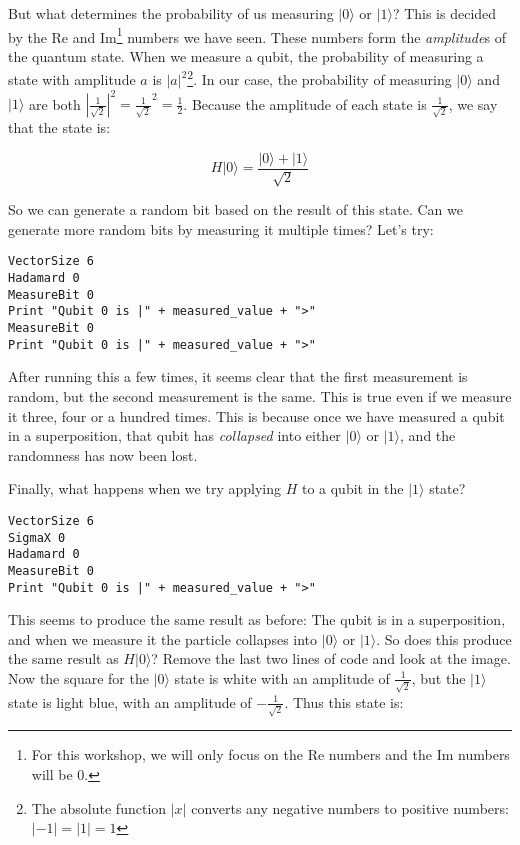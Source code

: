 \documentclass[twocolumn]{article}
\begin{document}
But what determines the probability of us measuring $|0\rangle$ or $|1\rangle$? This is decided by the Re and Im\footnote{For this workshop, we will only focus on the Re numbers and the Im numbers will be $0$.} numbers we have seen. These numbers form the {\em amplitude}s of the quantum state. When we measure a qubit, the probability of measuring a state with amplitude $a$ is $|a|^2$\footnote{The absolute function $|x|$ converts any negative numbers to positive numbers: $|-1| = |1| = 1$}. In our case, the probability of measuring $|0\rangle$ and $|1\rangle$ are both $|\frac{1}{\sqrt{2}}|^2 = \frac{1}{\sqrt{2}}^2 = \frac{1}{2}$. Because the amplitude of each state is $\frac{1}{\sqrt{2}}$, we say that the state is:

$$H|0\rangle = \frac{|0\rangle + |1\rangle}{\sqrt{2}}$$

So we can generate a random bit based on the result of this state. Can we generate more random bits by measuring it multiple times? Let's try:

\begin{lstlisting}
VectorSize 6
Hadamard 0
MeasureBit 0
Print "Qubit 0 is |" + measured_value + ">"
MeasureBit 0
Print "Qubit 0 is |" + measured_value + ">"
\end{lstlisting}

After running this a few times, it seems clear that the first measurement is random, but the second measurement is the same. This is true even if we measure it three, four or a hundred times. This is because once we have measured a qubit in a superposition, that qubit has {\em collapsed} into either $|0\rangle$ or $|1\rangle$, and the randomness has now been lost.

Finally, what happens when we try applying $H$ to a qubit in the $|1\rangle$ state?

\begin{lstlisting}
VectorSize 6
SigmaX 0
Hadamard 0
MeasureBit 0
Print "Qubit 0 is |" + measured_value + ">"
\end{lstlisting}

This seems to produce the same result as before: The qubit is in a superposition, and when we measure it the particle collapses into $|0\rangle$ or $|1\rangle$. So does this produce the same result as $H|0\rangle$? Remove the last two lines of code and look at the image. Now the square for the $|0\rangle$ state is white with an amplitude of $\frac{1}{\sqrt{2}}$, but the $|1\rangle$ state is light blue, with an amplitude of $-\frac{1}{\sqrt{2}}$. Thus this state is:
\end{document}
